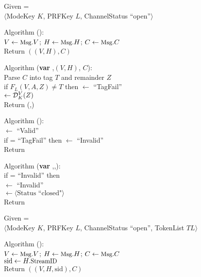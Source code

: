 \begin{figure}
{
Given =\\[-0.5ex]
\nudge\nudge$\langle$ModeKey $K$, PRFKey $L$, ChannelStatus
``open''$\rangle$ 

\medskip
Algorithm ():\\
\nudge $V \gets \textrm{\small Msg}.V$; $H \gets \textrm{\small Msg}.H$; $C \gets
\textrm{\small Msg}.C$\\
\nudge Return $\left((V, H),C\right)$

\medskip
Algorithm ({\bf var} ,$(V,H)$, $C$):\\
\nudge Parse $C$ into tag $T$ and remainder $Z$\\ 
\nudge if $F_L(V,A,Z) \neq T$ then  $\gets$ ``TagFail''\\
\nudge{} $\gets \mathcal{D}_K^{V}(Z)$\\
\nudge Return (,)

\medskip
Algorithm ():\\
\nudge {} $\gets$ ``Valid''\\
\nudge if  =  ``TagFail'' then  $\gets$ ``Invalid''\\
\nudge Return 

\medskip
Algorithm ({\bf var} ,,):\\
\nudge if  = ``Invalid'' then \\
\nudge\nudge {} $\gets$ ``Invalid'' \\
\nudge\nudge {} $\gets \langle
\mbox{Status ``closed"} \rangle$\\
\nudge Return 
}
%
{
Given =\\[-0.5ex]
\nudge\nudge $\langle$ModeKey $K$, PRFKey $L$, ChannelStatus ``open'',
TokenList $ \mathit{TL}\rangle$

\medskip
Algorithm ():\\
\nudge $V \gets \textrm{\small Msg}.V$; $H \gets \textrm{\small Msg}.H$; $C \gets \textrm{\small Msg}.C$\\
\nudge $\mathrm{sid} \gets H.\textrm{\small StreamID}$\\
\nudge Return $\left((V, H, \mathrm{sid}),C\right)$

}
\end{figure}
